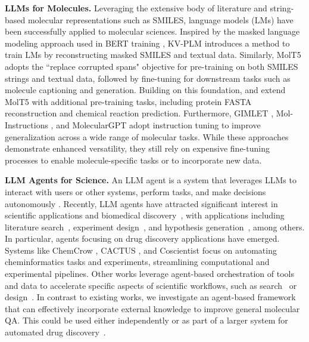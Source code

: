 \noindent \textbf{LLMs for Molecules.}
Leveraging the extensive body of literature and string-based molecular representations such as SMILES, language models (LMs) have been successfully applied to molecular sciences. 
Inspired by the masked language modeling approach used in BERT training \citep{devlin2018bert}, KV-PLM \citep{zeng2022deep} introduces a method to train LMs by reconstructing masked SMILES and textual data. 
Similarly, MolT5 \citep{edwards2022translation} adopts the ``replace corrupted spans" objective \citep{raffel2020exploring} for pre-training on both SMILES strings and textual data, followed by fine-tuning for downstream tasks such as molecule captioning and generation. 
Building on this foundation, \citet{pei2023biot5} and \citet{christofidellis2023unifying} extend MolT5 with additional pre-training tasks, including protein FASTA reconstruction and chemical reaction prediction.
Furthermore, GIMLET \cite{zhao2023gimlet}, Mol-Instructions \cite{fang2023mol}, and MolecularGPT \cite{liu2024moleculargpt} adopt instruction tuning \cite{zhang2023instruction} to improve generalization across a wide range of molecular tasks. 
While these approaches demonstrate enhanced versatility, they still rely on expensive fine-tuning processes to enable molecule-specific tasks or to incorporate new data.

\noindent \textbf{LLM Agents for Science.}
An LLM agent is a system that leverages LLMs to interact with users or other systems, perform tasks, and make decisions autonomously \cite{wang2024survey}. 
Recently, LLM agents have attracted significant interest in scientific applications and biomedical discovery~\cite{gao2024empowering}, with applications including literature search~\cite{lala2023paperqa}, experiment design~\cite{roohani2024biodiscoveryagent}, and hypothesis generation~\cite{wang-etal-2024-scimon}, among others. In particular, agents focusing on drug discovery applications have emerged. Systems like ChemCrow \cite{bran2023chemcrow}, CACTUS \cite{mcnaughton2024cactus}, and Coscientist \cite{boiko2023autonomous} focus on automating cheminformatics tasks and experiments, streamlining computational and experimental pipelines. Other works leverage agent-based orchestration of tools and data to accelerate specific aspects of scientific workflows, such as search~\cite{odonoghue2023bioplanner} or design~\cite{ghafarollahi2024protagents}. In contrast to existing works, we investigate an agent-based framework that can effectively incorporate external knowledge to improve general molecular QA. This could be used either independently or as part of a larger system for automated drug discovery~\cite{tom2024self}.


